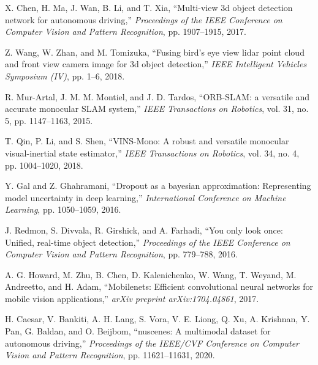 \documentclass[12pt,oneside]{book}
\begin{document}
\begin{thebibliography}{99}
X. Chen, H. Ma, J. Wan, B. Li, and T. Xia,
``Multi-view 3d object detection network for autonomous driving,''
\emph{Proceedings of the IEEE Conference on Computer Vision and Pattern Recognition}, pp. 1907--1915, 2017.

Z. Wang, W. Zhan, and M. Tomizuka,
``Fusing bird's eye view lidar point cloud and front view camera image for 3d object detection,''
\emph{IEEE Intelligent Vehicles Symposium (IV)}, pp. 1--6, 2018.

R. Mur-Artal, J. M. M. Montiel, and J. D. Tardos,
``ORB-SLAM: a versatile and accurate monocular SLAM system,''
\emph{IEEE Transactions on Robotics}, vol. 31, no. 5, pp. 1147--1163, 2015.

T. Qin, P. Li, and S. Shen,
``VINS-Mono: A robust and versatile monocular visual-inertial state estimator,''
\emph{IEEE Transactions on Robotics}, vol. 34, no. 4, pp. 1004--1020, 2018.

Y. Gal and Z. Ghahramani,
``Dropout as a bayesian approximation: Representing model uncertainty in deep learning,''
\emph{International Conference on Machine Learning}, pp. 1050--1059, 2016.

J. Redmon, S. Divvala, R. Girshick, and A. Farhadi,
``You only look once: Unified, real-time object detection,''
\emph{Proceedings of the IEEE Conference on Computer Vision and Pattern Recognition}, pp. 779--788, 2016.

A. G. Howard, M. Zhu, B. Chen, D. Kalenichenko, W. Wang, T. Weyand, M. Andreetto, and H. Adam,
``Mobilenets: Efficient convolutional neural networks for mobile vision applications,''
\emph{arXiv preprint arXiv:1704.04861}, 2017.

H. Caesar, V. Bankiti, A. H. Lang, S. Vora, V. E. Liong, Q. Xu, A. Krishnan, Y. Pan, G. Baldan, and O. Beijbom,
``nuscenes: A multimodal dataset for autonomous driving,''
\emph{Proceedings of the IEEE/CVF Conference on Computer Vision and Pattern Recognition}, pp. 11621--11631, 2020.

\end{thebibliography}
\end{document}

